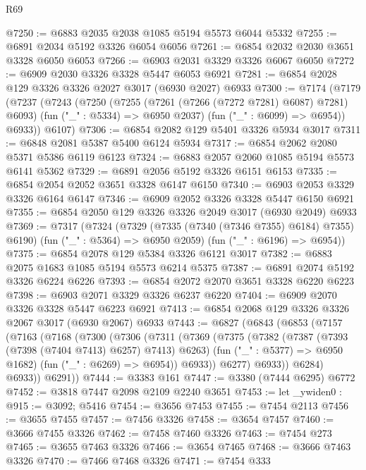 \begin{lexlean}{R69}
\begin{coremodule}
@7250 := @6883 @2035 @2038 @1085 @5194 @5573 @6044 @5332
@7255 := @6891 @2034 @5192 @3326 @6054 @6056
@7261 := @6854 @2032 @2030 @3651 @3328 @6050 @6053
@7266 := @6903 @2031 @3329 @3326 @6067 @6050
@7272 := @6909 @2030 @3326 @3328 @5447 @6053 @6921
@7281 := @6854 @2028 @129 @3326 @3326 @2027 @3017 (@6930 @2027) @6933
@7300 := @7174
    (@7179
      (@7237
        (@7243
          (@7250
            (@7255 (@7261 (@7266 (@7272 @7281) @6087) @7281) @6093)
            (fun ("_" : @5334) => @6950 @2037)
            (fun ("_" : @6099) => @6954))
          @6933))
      @6107)
@7306 := @6854 @2082 @129 @5401 @3326 @5934 @3017
@7311 := @6848 @2081 @5387 @5400 @6124 @5934
@7317 := @6854 @2062 @2080 @5371 @5386 @6119 @6123
@7324 := @6883 @2057 @2060 @1085 @5194 @5573 @6141 @5362
@7329 := @6891 @2056 @5192 @3326 @6151 @6153
@7335 := @6854 @2054 @2052 @3651 @3328 @6147 @6150
@7340 := @6903 @2053 @3329 @3326 @6164 @6147
@7346 := @6909 @2052 @3326 @3328 @5447 @6150 @6921
@7355 := @6854 @2050 @129 @3326 @3326 @2049 @3017 (@6930 @2049) @6933
@7369 := @7317
    (@7324
      (@7329 (@7335 (@7340 (@7346 @7355) @6184) @7355) @6190)
      (fun ("_" : @5364) => @6950 @2059)
      (fun ("_" : @6196) => @6954))
@7375 := @6854 @2078 @129 @5384 @3326 @6121 @3017
@7382 := @6883 @2075 @1683 @1085 @5194 @5573 @6214 @5375
@7387 := @6891 @2074 @5192 @3326 @6224 @6226
@7393 := @6854 @2072 @2070 @3651 @3328 @6220 @6223
@7398 := @6903 @2071 @3329 @3326 @6237 @6220
@7404 := @6909 @2070 @3326 @3328 @5447 @6223 @6921
@7413 := @6854 @2068 @129 @3326 @3326 @2067 @3017 (@6930 @2067) @6933
@7443 := @6827
    (@6843
      (@6853
        (@7157
          (@7163
            (@7168
              (@7300
                (@7306
                  (@7311
                    (@7369
                      (@7375
                        (@7382
                          (@7387 (@7393 (@7398 (@7404 @7413) @6257) @7413) @6263)
                          (fun ("_" : @5377) => @6950 @1682)
                          (fun ("_" : @6269) => @6954))
                        @6933))
                    @6277)
                  @6933))
              @6284)
            @6933))
        @6291))
@7444 := @3383 @161
@7447 := @3380 (@7444 @6295) @6772
@7452 := @3818 @7447 @2098 @2109 @2240 @3651
@7453 := let _ywiden0 : @915 := @3092; @5416
@7454 := @3656 @7453
@7455 := @7454 @2113
@7456 := @3655 @7455
@7457 := @7456 @3326
@7458 := @3654 @7457
@7460 := @3666 @7455 @3326
@7462 := @7458 @7460 @3326
@7463 := @7454 @273
@7465 := @3655 @7463 @3326
@7466 := @3654 @7465
@7468 := @3666 @7463 @3326
@7470 := @7466 @7468 @3326
@7471 := @7454 @333

\end{coremodule}
\end{lexlean}
